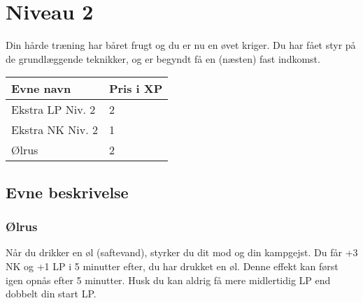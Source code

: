 \chapter*{Niveau 2}
Din hårde træning har båret frugt og du er nu en øvet kriger. Du har fået styr på de grundlæggende teknikker, og er begyndt få en (næsten) fast indkomst. 
\begin{table}[H]
    \centering
    \begin{tabular}{|p{}|p{}|}
    \rowcolor{cerulean!80}\hline
        Evne navn & Pris i XP \\\hline
         Ekstra LP Niv. 2 & 2 \\\hline
         Ekstra NK Niv. 2 & 1 \\\hline
         Ølrus & 2\\
         \hline
    \end{tabular}
\end{table}
\section{Evne beskrivelse}





\subsection{Ølrus}
Når du drikker en øl (saftevand), styrker du dit mod og din kampgejst. Du får +3 NK og +1 LP i 5 minutter efter, du har drukket en øl. Denne effekt kan først igen opnås efter 5 minutter. Husk du kan aldrig få mere midlertidig LP end dobbelt din start LP.\\